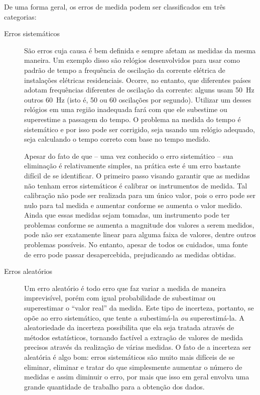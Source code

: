 De uma forma geral, os erros de medida podem ser classificados em três categorias\cite{LivroAmarelo}\cite{LivroEAD}:
\begin{description}
\item[Erros sistemáticos] São erros cuja causa é bem definida e sempre afetam as medidas da mesma maneira. Um exemplo disso são relógios desenvolvidos para usar como padrão de tempo a frequência de oscilação da corrente elétrica de instalações elétricas residenciais. Ocorre, no entanto, que diferentes países adotam frequências diferentes de oscilação da corrente: alguns usam 50~Hz outros 60~Hz (isto é, 50 ou 60 oscilações por segundo). Utilizar um desses relógios em uma região inadequada fará com que ele subestime ou superestime a passagem do tempo. O problema na medida do tempo é sistemático e por isso pode ser corrigido, seja usando um relógio adequado, seja calculando o tempo correto com base no tempo medido.

Apesar do fato de que -- uma vez conhecido o erro sistemático -- sua eliminação é relativamente simples, na prática este é um erro bastante difícil de se identificar. O primeiro passo visando garantir que as medidas não tenham erros sistemáticos é calibrar os instrumentos de medida. Tal calibração não pode ser realizada para um único valor, pois o erro pode ser nulo para tal medida e aumentar conforme se aumenta o valor medido. Ainda que essas medidas sejam tomadas, um instrumento pode ter problemas conforme se aumenta a magnitude dos valores a serem medidos, pode não ser exatamente linear para alguma faixa de valores, dentre outros problemas possíveis. No entanto, apesar de todos os cuidados, uma fonte de erro pode passar desapercebida, prejudicando as medidas obtidas.

\item[Erros aleatórios] Um erro aleatório é todo erro que faz variar a medida de maneira imprevisível, porém com igual probabilidade de subestimar ou superestimar o ``valor real'' da medida. Este tipo de incerteza, portanto, se opõe ao erro sistemático, que tente a subestimá-la \emph{ou} superestimá-la. A aleatoriedade da incerteza possibilita que ela seja tratada através de métodos estatísticos, tornando factível a extração de valores de medida precisos através da realização de várias medidas. O fato de a incerteza ser aleatória é algo bom: erros sistemáticos são muito mais difíceis de se eliminar, eliminar e tratar do que simplesmente aumentar o número de medidas e assim diminuir o erro, por mais que isso em geral envolva uma grande quantidade de trabalho para a obtenção dos dados.


\end{description}
